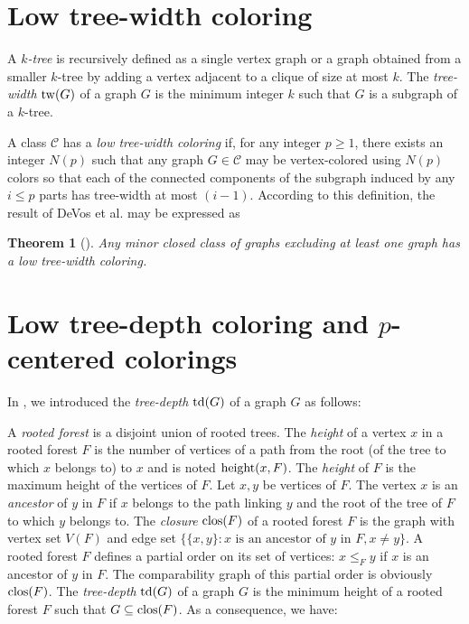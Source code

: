 \documentclass[a4paper]{amsart}
\newtheorem{theorem}{Theorem}[section]
\theoremstyle{definition}
\theoremstyle{remark}
\DeclareMathOperator\depth{{\rm td}}
\DeclareMathOperator\clos{{\rm clos}}
\DeclareMathOperator\height{{\rm height}}
\DeclareMathOperator\tw{{\rm tw}}
\begin{document}
\section{Low tree-width coloring}
\label{sec:tw}

A {\em $k$-tree} is recursively defined as a single vertex graph or a
graph obtained from a smaller $k$-tree by adding a vertex adjacent to a
clique of size at most $k$. The {\em tree-width} $\tw(G)$ of a graph
$G$ is the minimum integer $k$ such that $G$ is a subgraph of a
$k$-tree.

A class $\mathcal C$ has a {\em low tree-width coloring} if, for any
integer $p\geq 1$, there exists an integer $N(p)$ such that any graph
$G\in\mathcal C$ may be vertex-colored using $N(p)$ colors so that
each of the connected components of the subgraph induced
by any $i\leq p$ parts has tree-width at most $(i-1)$.
According to this definition, the result of DeVos et al. may be
expressed as

\begin{theorem}[\cite{2tw}]
\label{th:2tw}
Any minor closed class of graphs excluding at least one graph has a
low tree-width coloring.
\end{theorem}
\section{Low tree-depth coloring and $p$-centered colorings}
\label{sec:td}
In \cite{Taxi_tdepth}, we introduced
the {\em tree-depth} $\depth(G)$ of a graph $G$ as follows:


A {\em rooted forest} is a disjoint union of rooted trees.
The {\em height} of a vertex $x$ in a rooted
forest $F$ is the number of vertices of a
path from the root (of the tree to which $x$ belongs to) to $x$ and is noted $\height(x,F)$.
The {\em height} of $F$ is the maximum height of the vertices of $F$.
Let $x,y$ be vertices of $F$. The vertex $x$ is an {\em ancestor} of $y$ in $F$ if $x$ belongs to
the path linking $y$ and the root of the tree of $F$ to which $y$ belongs to.
The {\em closure} $\clos(F)$ of a rooted forest $F$ is the graph with
vertex set $V(F)$ and edge set $\{\{x,y\}: x\text{ is an ancestor of
  }y\text{ in }F, x \neq y\}$. A rooted forest $F$ defines a partial order on its set of vertices:
$x\leq_F y$ if $x$ is an ancestor of $y$ in $F$.
The comparability graph of this partial order is obviously $\clos(F)$.
The {\em tree-depth} $\depth(G)$ of a graph $G$ is the minimum height
of a rooted forest $F$ such that $G\subseteq\clos(F)$. As a
consequence, we have:
\end{document}
